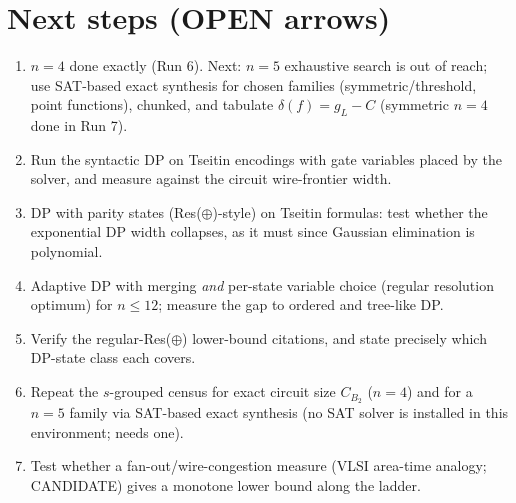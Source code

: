 \documentclass[11pt]{article}
\begin{document}
\section{Next steps (OPEN arrows)}
\begin{enumerate}
\item $n=4$ done exactly (Run 6). Next: $n=5$ exhaustive search is out of reach; use SAT-based exact synthesis for chosen families (symmetric/threshold, point functions), chunked, and tabulate $\delta(f)=g_L-C$ (symmetric $n=4$ done in Run 7).
\item Run the syntactic DP on Tseitin encodings with gate variables placed by the solver, and measure against the circuit wire-frontier width.
\item DP with parity states (Res($\oplus$)-style) on Tseitin formulas: test whether the exponential DP width collapses, as it must since Gaussian elimination is polynomial.
\item Adaptive DP with merging \emph{and} per-state variable choice (regular resolution optimum) for $n\le12$; measure the gap to ordered and tree-like DP.
\item Verify the regular-Res($\oplus$) lower-bound citations, and state precisely which DP-state class each covers.
\item Repeat the $s$-grouped census for exact circuit size $C_{B_2}$ ($n=4$) and for a $n=5$ family via SAT-based exact synthesis (no SAT solver is installed in this environment; needs one).
\item Test whether a fan-out/wire-congestion measure (VLSI area-time analogy; CANDIDATE) gives a monotone lower bound along the ladder.
\end{enumerate}
\end{document}
